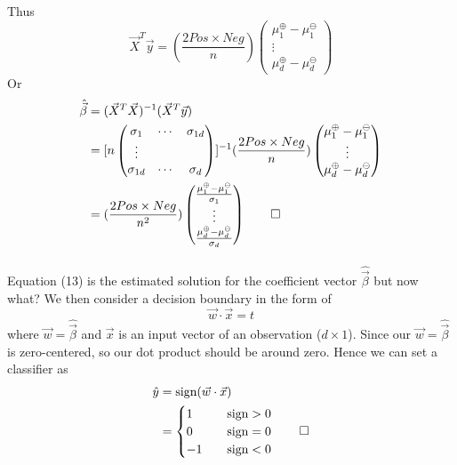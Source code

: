 \documentclass{article}
\begin{document}
Thus
\begin{equation*}
    \Vec{X}^T\Vec{y} = (\frac{2Pos\times Neg}{n}) 
    \begin{pmatrix}
    \mu_1^{\oplus}-\mu_1^{\ominus} \\
    \vdots \\
    \mu_d^{\oplus}-\mu_d^{\ominus}
    \end{pmatrix}
\end{equation*}
Or
\begin{align}
    \hat{\Vec{\beta}} &=
    (\Vec{X}^T\Vec{X})^{-1}(\Vec{X}^T\Vec{y}) \nonumber \\
    &=
    [n     \begin{pmatrix}
    \sigma_{1} & \cdots & \sigma_{1d} \\
    \vdots \\
    \sigma_{1d} & \cdots & \sigma_{d}
    \end{pmatrix}]^{-1}
    (\frac{2Pos\times Neg}{n}) 
    \begin{pmatrix}
    \mu_1^{\oplus}-\mu_1^{\ominus} \\
    \vdots \\
    \mu_d^{\oplus}-\mu_d^{\ominus}
    \end{pmatrix} \nonumber \\
    &=
    (\frac{2Pos\times Neg}{n^2}) 
    \begin{pmatrix}
    \frac{\mu_1^{\oplus}-\mu_1^{\ominus}}{\sigma_1} \\
    \vdots \\
    \frac{\mu_d^{\oplus}-\mu_d^{\ominus}}{\sigma_d}
    \end{pmatrix} \qed 
\end{align}

\paragraph{}
Equation (13) is the estimated solution for the coefficient vector $\hat{\Vec{\beta}}$ but now what? We then consider a decision boundary in the form of 
\begin{equation}
    \Vec{w}\cdot \Vec{x} = t
\end{equation}
where $\Vec{w} = \hat{\Vec{\beta}}$ and $\Vec{x}$ is an input vector of an observation ($d\times1$). Since our $\Vec{w} = \hat{\Vec{\beta}}$ is zero-centered, so our dot product should be around zero. Hence we can set a classifier as 
\begin{align*}
    \hat{y} &= \text{sign}(\Vec{w}\cdot \Vec{x}) \\
    &=
    \begin{cases}
    1 &\quad \text{sign}>0 \\
    0 &\quad \text{sign}=0 \\
    -1 &\quad \text{sign}<0
    \end{cases} \qed
\end{align*}
\end{document}
